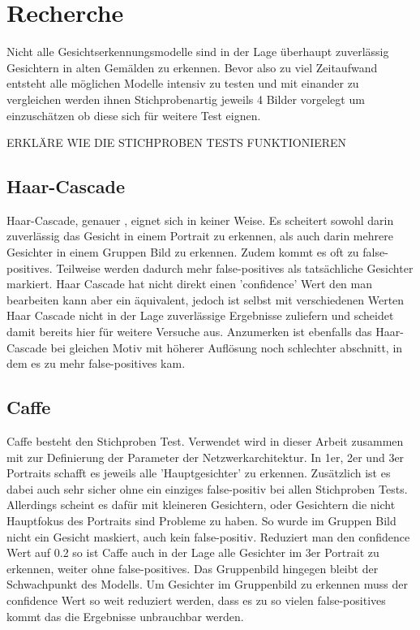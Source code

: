 \chapter{Recherche}

Nicht alle Gesichtserkennungsmodelle sind in der Lage überhaupt zuverlässig Gesichtern in alten Gemälden zu erkennen. Bevor also zu viel Zeitaufwand entsteht alle möglichen Modelle intensiv zu testen und mit einander zu vergleichen werden ihnen Stichprobenartig jeweils 4 Bilder vorgelegt um einzuschätzen ob diese sich für weitere Test eignen.

ERKLÄRE WIE DIE STICHPROBEN TESTS FUNKTIONIEREN

\section{Haar-Cascade}
Haar-Cascade, genauer , eignet sich in keiner Weise. Es scheitert sowohl darin zuverlässig das Gesicht in einem Portrait zu erkennen, als auch darin mehrere Gesichter in einem Gruppen Bild zu erkennen. Zudem kommt es oft zu false-positives. Teilweise werden dadurch mehr false-positives als tatsächliche Gesichter markiert. Haar Cascade hat nicht direkt einen 'confidence' Wert den man bearbeiten kann aber ein äquivalent, jedoch ist selbst mit verschiedenen Werten Haar Cascade nicht in der Lage zuverlässige Ergebnisse zuliefern und scheidet damit bereits hier für weitere Versuche aus.
Anzumerken ist ebenfalls das Haar-Cascade bei gleichen Motiv mit höherer Auflösung noch schlechter abschnitt, in dem es zu mehr false-positives kam.

\section{Caffe}
Caffe besteht den Stichproben Test. Verwendet wird in dieser Arbeit  zusammen mit  zur Definierung der Parameter der Netzwerkarchitektur. In 1er, 2er und 3er Portraits schafft es jeweils alle 'Hauptgesichter' zu erkennen. Zusätzlich ist es dabei auch sehr sicher ohne ein einziges false-positiv bei allen Stichproben Tests. Allerdings scheint es dafür mit kleineren Gesichtern, oder Gesichtern die nicht Hauptfokus des Portraits sind Probleme zu haben. So wurde im Gruppen Bild nicht ein Gesicht maskiert, auch kein false-positiv. Reduziert man den confidence Wert auf 0.2 so ist Caffe auch in der Lage alle Gesichter im 3er Portrait zu erkennen, weiter ohne false-positives. Das Gruppenbild hingegen bleibt der Schwachpunkt des Modells. Um Gesichter im Gruppenbild zu erkennen muss der confidence Wert so weit reduziert werden, dass es zu so vielen false-positives kommt das die Ergebnisse unbrauchbar werden. %
